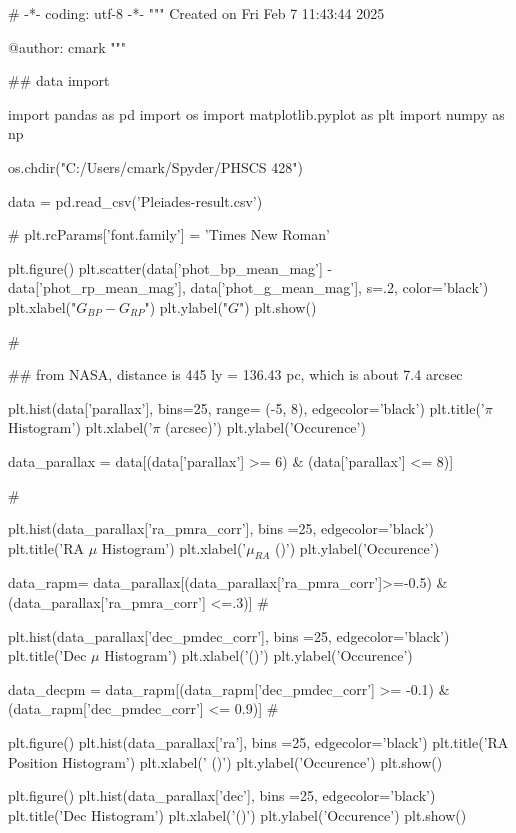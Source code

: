 \documentclass{article}
\begin{document}
\begin{python}
    # -*- coding: utf-8 -*-
    """
    Created on Fri Feb  7 11:43:44 2025

    @author: cmark
    """

    ## data import

    import pandas as pd
    import os 
    import matplotlib.pyplot as plt
    import numpy as np

    os.chdir("C:/Users/cmark/Spyder/PHSCS 428")

    data = pd.read_csv('Pleiades-result.csv')

    #%
    plt.rcParams['font.family'] = 'Times New Roman'

    plt.figure()
    plt.scatter(data['phot_bp_mean_mag'] - data['phot_rp_mean_mag'], data['phot_g_mean_mag'], s=.2, color='black')
    plt.xlabel("$G_{BP} - G_{RP}$")
    plt.ylabel("$G$")
    plt.show()

    #%

    ## from NASA, distance is 445 ly = 136.43 pc, which is about 7.4 arcsec

    plt.hist(data['parallax'], bins=25, range= (-5, 8), edgecolor='black')
    plt.title('$\pi$ Histogram')
    plt.xlabel('$\pi$ (arcsec)')
    plt.ylabel('Occurence')

    data_parallax = data[(data['parallax'] >= 6) & (data['parallax'] <= 8)]

    #%

    plt.hist(data_parallax['ra_pmra_corr'], bins =25, edgecolor='black')
    plt.title('RA $\mu$ Histogram')
    plt.xlabel('$\mu_{RA}$ ()')
    plt.ylabel('Occurence')

    data_rapm= data_parallax[(data_parallax['ra_pmra_corr']>=-0.5) & (data_parallax['ra_pmra_corr'] <=.3)]
    #%

    plt.hist(data_parallax['dec_pmdec_corr'], bins =25, edgecolor='black')
    plt.title('Dec $\mu$ Histogram')
    plt.xlabel('()')
    plt.ylabel('Occurence')

    data_decpm = data_rapm[(data_rapm['dec_pmdec_corr'] >= -0.1) & (data_rapm['dec_pmdec_corr'] <= 0.9)]
    #%

    plt.figure()
    plt.hist(data_parallax['ra'], bins =25, edgecolor='black')
    plt.title('RA Position Histogram')
    plt.xlabel(' ()')
    plt.ylabel('Occurence')
    plt.show() 

    plt.figure()
    plt.hist(data_parallax['dec'], bins =25, edgecolor='black')
    plt.title('Dec Histogram')
    plt.xlabel('()')
    plt.ylabel('Occurence')
    plt.show()


\end{python}
\end{document}
